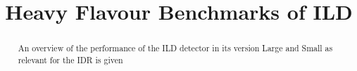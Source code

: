\documentclass[preprint]{elsarticle}
\newcommand{\ecal}{Si-W ECAL}
\newcommand{\ecalp}{\ecal\ physics prototype}
\newcommand{\tfa}{track-finding algorithm}
\newcommand{\geantfour}{{\sc geant4}}
\begin{document}
%

\begin{frontmatter}

\title{\LARGE\bf Heavy Flavour Benchmarks of ILD}

%


\begin{abstract}
An overview of the performance of the ILD detector in its version Large and Small as relevant for the IDR is given 

\end{abstract}


\end{frontmatter}


\end{document}
